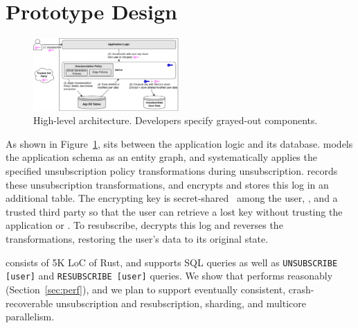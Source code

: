 \section{Prototype Design}
\label{sec:proto}

\begin{figure}[t!]
    \centering
    \includegraphics[width=0.5\textwidth]{img/releaser_arch}

    \caption{High-level \sys architecture. Developers specify grayed-out components.}
    \label{fig:arch}
\end{figure}

As shown in Figure~\ref{fig:arch}, \sys sits between the application logic and its database. \sys
models the application schema as an entity graph, and systematically applies the specified
unsubscription policy transformations during unsubscription.
\sys records these unsubscription transformations, and encrypts and stores this
log in an additional table. The encrypting key is secret-shared~\cite{secretsharing} among the user,
\sys, and a trusted third party so that the user can retrieve a lost key without trusting the
application or \sys. To resubscribe, \sys decrypts this log and reverses the transformations,
restoring the user's data to its original state.

\sys consists of 5K LoC of Rust, and supports SQL queries as well as \texttt{UNSUBSCRIBE
[user]} and \texttt{RESUBSCRIBE [user]} queries.
We show that \sys performs reasonably (Section~\ref{sec:perf}), and we plan to support eventually
consistent, crash-recoverable unsubscription and resubscription, sharding, and multicore parallelism.



